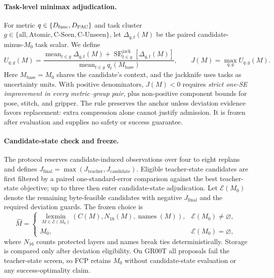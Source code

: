 \paragraph{Task-level minimax adjudication.}
For metric $q\in\{D_{\mathrm{func}},D_{\mathrm{PAC}}\}$ and task cluster $g\in\{\mathrm{all},\mathrm{Atomic},\mathrm{C\text{-}Seen},\mathrm{C\text{-}Unseen}\}$, let $\Delta_{q,t}(M)$ be the paired candidate-minus-$M_0$ task scalar. We define
\begin{equation}
 U_{q,g}(M)=
 \frac{\operatorname{mean}_{t\in g}\Delta_{q,t}(M)+
 \operatorname{SE}^{\mathrm{jack}}_{t\in g}[\Delta_{q,t}(M)]}
 {\operatorname{mean}_{t\in g}q_t(M_{\mathrm{base}})},
 \qquad
 J(M)=\max_{q,g}U_{q,g}(M).
 \label{eq:minimax}
\end{equation}
Here $M_{\mathrm{base}}=M_0$ shares the candidate's context, and the jackknife uses tasks as uncertainty units. With positive denominators, $J(M)<0$ requires \emph{strict one-SE improvement in every metric--group pair}, plus non-positive component bounds for pose, stitch, and gripper. The rule preserves the anchor unless deviation evidence favors replacement: extra compression alone cannot justify admission. It is frozen after evaluation and supplies no safety or success guarantee.

\paragraph{Candidate-state check and freeze.}
The protocol reserves candidate-induced observations over four to eight replans and defines $J_{\mathrm{final}}=\max(J_{\mathrm{teacher}},J_{\mathrm{candidate}})$. Eligible teacher-state candidates are first filtered by a paired one-standard-error comparison against the best teacher-state objective; up to three then enter candidate-state adjudication. Let $\mathcal E(M_0)$ denote the remaining byte-feasible candidates with negative $J_{\mathrm{final}}$ and the required deviation guards. The frozen choice is
\begin{equation}
 \widehat M=\begin{cases}
 \operatorname*{lexmin}_{M\in\mathcal E(M_0)}
  (C(M),N_{16}(M),\operatorname{names}(M)),&\mathcal E(M_0)\ne\varnothing,\\
 M_0,&\mathcal E(M_0)=\varnothing,
 \end{cases}
 \label{eq:restricted_freeze}
\end{equation}
where $N_{16}$ counts protected layers and names break ties deterministically. Storage is compared only after deviation eligibility. On GR00T all proposals fail the teacher-state screen, so FCP retains $M_0$ without candidate-state evaluation or any success-optimality claim.

